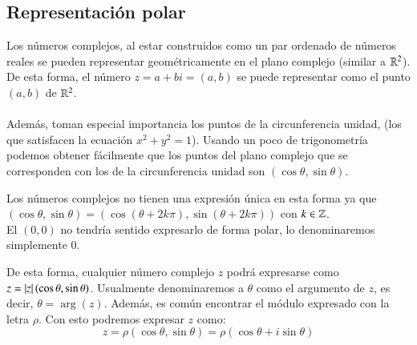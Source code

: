 \subsection{Representaci\'on polar}
    Los números complejos, al estar construidos como un par ordenado de números reales se pueden representar geométricamente en el plano complejo (similar a $\mathbb{R}^2$). De esta forma, el número $z = a + bi = (a, b)$ se puede representar como el punto $(a, b)$ de $\mathbb{R}^2$.\\\\
    Además, toman especial importancia los puntos de la circunferencia unidad, (los que satisfacen la ecuación $x^2 + y^2 = 1$). Usando un poco de trigonometría podemos obtener fácilmente que los puntos del plano complejo que se corresponden con los de la circunferencia unidad son $(\cos \theta, \sin \theta)$.

    \begin{obs}
        Los números complejos no tienen una expresión única en esta forma ya que $(\cos \theta, \sin \theta) = (\cos (\theta + 2k\pi), \sin  (\theta + 2k\pi) )$ con $k \in \mathbb{Z}$.\\
        El $(0, 0)$ no tendría sentido expresarlo de forma polar, lo denominaremos simplemente $0$.
    \end{obs}

    \begin{center}
    \end{center}

    De esta forma, cualquier número complejo $z$ podrá expresarse como $z = \left|z\right|(\cos \theta, \sin \theta)$. Usualmente denominaremos a $\theta$ como el argumento de $z$, es decir, $\theta=\arg(z)$. Además, es común encontrar el módulo expresado con la letra $\rho$. Con esto podremos expresar $z$ como:\\
    $$
        z = \rho(\cos \theta, \sin \theta) = \rho(\cos \theta + i \sin \theta)
    $$

